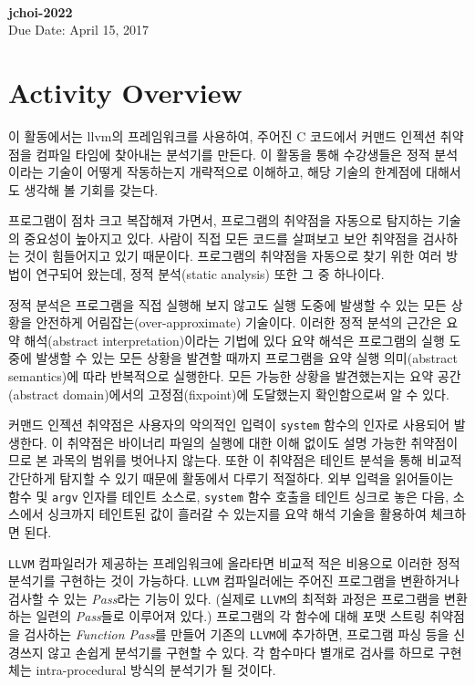 \documentclass[a4paper, 11pt]{article}
\theoremstyle{definition}
\begin{document}
 \\
         {\phantom{} \hfill \textbf{jchoi-2022}} \\
         {\phantom{} \hfill Due Date: April 15, 2017} \\

\section{Activity Overview}
이 활동에서는 llvm의 프레임워크를 사용하여, 주어진 C 코드에서 커맨드 인젝션
취약점을 컴파일 타임에 찾아내는 분석기를 만든다. 이 활동을 통해 수강생들은 정적
분석이라는 기술이 어떻게 작동하는지 개략적으로 이해하고, 해당 기술의 한계점에
대해서도 생각해 볼 기회를 갖는다.

프로그램이 점차 크고 복잡해져 가면서, 프로그램의 취약점을 자동으로 탐지하는
기술의 중요성이 높아지고 있다. 사람이 직접 모든 코드를 살펴보고 보안 취약점을
검사하는 것이 힘들어지고 있기 때문이다. 프로그램의 취약점을 자동으로 찾기 위한
여러 방법이 연구되어 왔는데, 정적 분석(static analysis) 또한 그 중 하나이다.

정적 분석은 프로그램을 직접 실행해 보지 않고도 실행 도중에 발생할 수 있는 모든
상황을 안전하게 어림잡는(over-approximate) 기술이다. 이러한 정적 분석의 근간은
요약 해석(abstract interpretation)이라는 기법에 있다\cite{abstract, framework}
요약 해석은 프로그램의 실행 도중에 발생할 수 있는 모든 상황을 발견할 때까지
프로그램을 요약 실행 의미(abstract semantics)에 따라 반복적으로 실행한다. 모든
가능한 상황을 발견했는지는 요약 공간(abstract domain)에서의 고정점(fixpoint)에
도달했는지 확인함으로써 알 수 있다\cite{PALecture}.

커맨드 인젝션 취약점은 사용자의 악의적인 입력이 \texttt{system} 함수의 인자로
사용되어 발생한다. 이 취약점은 바이너리 파일의 실행에 대한 이해 없이도 설명
가능한 취약점이므로 본 과목의 범위를 벗어나지 않는다. 또한 이 취약점은 테인트
분석을 통해 비교적 간단하게 탐지할 수 있기 때문에 활동에서 다루기 적절하다. 외부
입력을 읽어들이는 함수 및 \texttt{argv} 인자를 테인트 소스로, \texttt{system}
함수 호출을 테인트 싱크로 놓은 다음, 소스에서 싱크까지 테인트된 값이 흘러갈 수
있는지를 요약 해석 기술을 활용하여 체크하면 된다.

\texttt{LLVM} 컴파일러가 제공하는 프레임워크에 올라타면 비교적 적은 비용으로
이러한 정적 분석기를 구현하는 것이 가능하다. \texttt{LLVM} 컴파일러에는 주어진
프로그램을 변환하거나 검사할 수 있는 \emph{Pass}라는 기능이 있다\cite{LLVMPass}.
(실제로 \texttt{LLVM}의 최적화 과정은 프로그램을 변환하는 일련의 \emph{Pass}들로
이루어져 있다.) 프로그램의 각 함수에 대해 포맷 스트링 취약점을 검사하는
\emph{Function Pass}를 만들어 기존의 \texttt{LLVM}에 추가하면, 프로그램 파싱
등을 신경쓰지 않고 손쉽게 분석기를 구현할 수 있다. 각 함수마다 별개로 검사를
하므로 구현체는 intra-procedural 방식의 분석기가 될 것이다.
\end{document}
